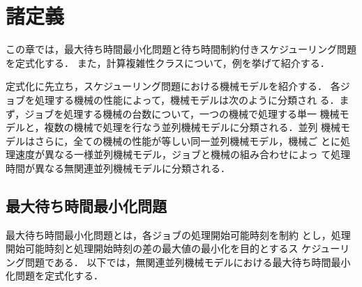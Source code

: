 \documentclass[12pt]{optlab-bachelor}
\begin{document}
\chapter{諸定義}\label{c_2}
この章では，最大待ち時間最小化問題と待ち時間制約付きスケジューリング問題を定式化する．
また，計算複雑性クラスについて，例を挙げて紹介する．

定式化に先立ち，スケジューリング問題における機械モデルを紹介する．
各ジョブを処理する機械の性能によって，機械モデルは次のように分類され
る．まず，ジョブを処理する機械の台数について，一つの機械で処理する単一
機械モデルと，複数の機械で処理を行なう並列機械モデルに分類される．並列
機械モデルはさらに，全ての機械の性能が等しい同一並列機械モデル，機械ご
とに処理速度が異なる一様並列機械モデル，ジョブと機械の組み合わせによっ
て処理時間が異なる無関連並列機械モデルに分類される．

\section{最大待ち時間最小化問題}
最大待ち時間最小化問題とは，各ジョブの処理開始可能時刻を制約
とし，処理開始可能時刻と処理開始時刻の差の最大値の最小化を目的とするス
ケジューリング問題である．
以下では，無関連並列機械モデルにおける最大待ち時間最小化問題を定式化する．
\end{document}
